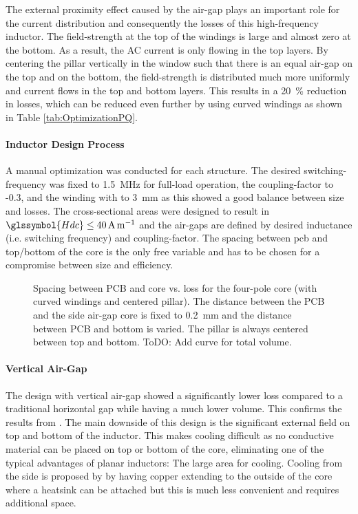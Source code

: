 \documentclass{IPEC2026}
\newcommand{\sbl}[1]{\glssymbol{#1}}
\newcommand{\ac}{\gls}
\begin{document}
The external proximity effect caused by the air-gap plays an important role for the current distribution and consequently the losses of this high-frequency inductor. The field-strength at the top of the windings is large and almost zero at the bottom. As a result, the AC current is only flowing in the top layers. By centering the pillar vertically in the window such that there is an equal air-gap on the top and on the bottom, the field-strength is distributed much more uniformly and current flows in the top and bottom layers. This results in a \qty{20}{\percent} reduction in losses, which can be reduced even further by using curved windings as shown in Table \ref{tab:OptimizationPQ}.

\paragraph{Inductor Design Process}
A manual optimization was conducted for each structure. The desired switching-frequency was fixed to \qty{1.5}{\MHz} for full-load operation, the coupling-factor to -0.3, and the winding with to \qty{3}{\mm} as this showed a good balance between size and losses. The cross-sectional areas were designed to result in $\sbl{Hdc} \leq \qty{40}{\A\per\m}$ and the air-gaps are defined by desired inductance (i.e. switching frequency) and coupling-factor. The spacing between \ac{pcb} and top/bottom of the core is the only free variable and has to be chosen for a compromise between size and efficiency.

\begin{figure}
  \centering
  
  \caption{Spacing between PCB and core vs. loss for the four-pole core (with curved windings and centered pillar). The distance between the PCB and the side air-gap core is fixed to \qty{0.2}{\mm} and the distance between PCB and bottom is varied. The pillar is always centered between top and bottom. ToDO: Add curve for total volume.}
  \label{fig:fourPole_spacingVsLoss}
\end{figure}

\paragraph{Vertical Air-Gap}
The design with vertical air-gap showed a significantly lower loss compared to a traditional horizontal gap while having a much lower volume. This confirms the results from \cite{schaferNovelHighlyEfficient2020}. The main downside of this design is the significant external field on top and bottom of the inductor. This makes cooling difficult as no conductive material can be placed on top or bottom of the core, eliminating one of the typical advantages of planar inductors: The large area for cooling. Cooling from the side is proposed by \cite{schaferNovelHighlyEfficient2020} by having copper extending to the outside of the core where a heatsink can be attached but this is much less convenient and requires additional space.
\end{document}
